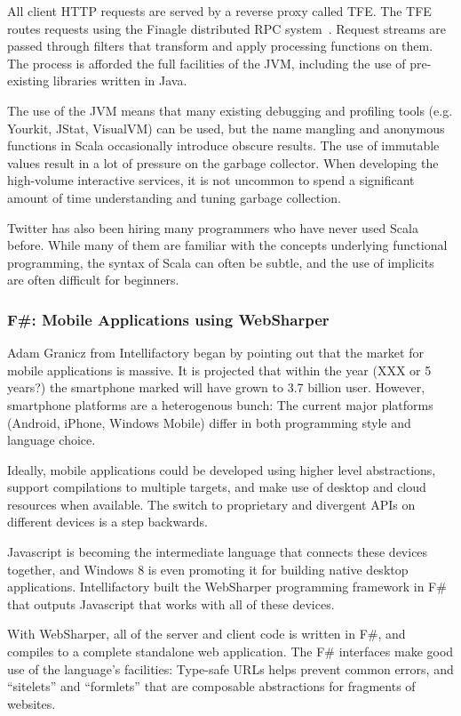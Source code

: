 \documentclass{jfp1}
\begin{document}
All client HTTP requests are served by a reverse proxy called TFE. The TFE routes 
requests using the Finagle distributed RPC system~\cite{f}. Request streams are 
passed through filters that transform and apply processing functions on them. 
The process is afforded the full facilities of the JVM, including the use of pre-existing
libraries written in Java.

The use of the JVM means that many existing debugging and profiling tools (e.g.
Yourkit, JStat, VisualVM) can be used, but the name mangling and anonymous
functions in Scala occasionally introduce obscure results.  The use of immutable
values result in a lot of pressure on the garbage collector. When developing the 
high-volume interactive services, it is not uncommon to spend a significant amount
of time understanding and tuning garbage collection.

Twitter has also been hiring many programmers who have never used Scala before.
While many of them are familiar with the concepts underlying functional programming,
the syntax of Scala can often be subtle, and the use of implicits are often
difficult for beginners.

\subsubsection{F\#: Mobile Applications using WebSharper}

Adam Granicz from Intellifactory began by pointing out that the market for
mobile applications is massive.  It is projected that within the year (XXX or 5 years?)
the smartphone marked will have grown to 3.7 billion user.  However, smartphone
platforms are a heterogenous bunch: The current major platforms (Android, iPhone,
Windows Mobile) differ in both programming style and language choice.

Ideally, mobile applications could be developed using higher level abstractions, 
support compilations to multiple targets, and make use of desktop
and cloud resources when available. The switch to proprietary and divergent 
APIs on different devices is a step backwards.

Javascript is becoming the intermediate language that connects these devices
together, and Windows 8 is even promoting it for building native desktop
applications. Intellifactory built the WebSharper programming framework in F\#
that outputs Javascript that works with all of these devices.

With WebSharper, all of the server and client code is written in F\#, and
compiles to a complete standalone web application. The F\# interfaces make 
good use of the language's facilities: Type-safe URLs helps prevent common errors, 
and ``sitelets'' and ``formlets'' that are composable abstractions for fragments of websites.
\end{document}
